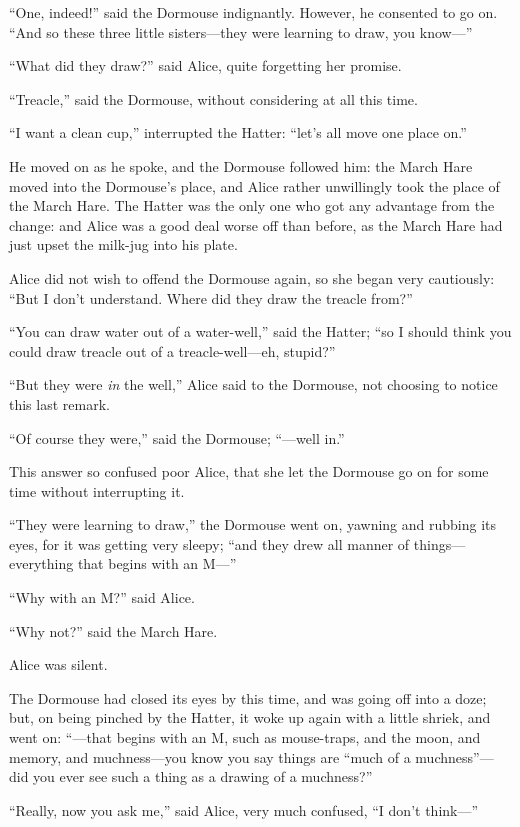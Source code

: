 \documentclass[11pt,openany,oneside]{book}
\begin{document}
“One, indeed!” said the Dormouse indignantly. However, he consented to go on. “And so these three little sisters—they were learning to draw, you know—” 

“What did they draw?” said Alice, quite forgetting her promise. 

“Treacle,” said the Dormouse, without considering at all this time. 

“I want a clean cup,” interrupted the Hatter: “let’s all move one place on.” 

He moved on as he spoke, and the Dormouse followed him: the March Hare moved into the Dormouse’s place, and Alice rather unwillingly took the place of the March Hare. The Hatter was the only one who got any advantage from the change: and Alice was a good deal worse off than before, as the March Hare had just upset the milk-jug into his plate. 

Alice did not wish to offend the Dormouse again, so she began very cautiously: “But I don’t understand. Where did they draw the treacle from?” 

“You can draw water out of a water-well,” said the Hatter; “so I should think you could draw treacle out of a treacle-well—eh, stupid?” 

“But they were {\em in\/} the well,” Alice said to the Dormouse, not choosing to notice this last remark. 

“Of course they were,” said the Dormouse; “—well in.” 

This answer so confused poor Alice, that she let the Dormouse go on for some time without interrupting it. 

“They were learning to draw,” the Dormouse went on, yawning and rubbing its eyes, for it was getting very sleepy; “and they drew all manner of things—everything that begins with an M—” 

“Why with an M?” said Alice. 

“Why not?” said the March Hare. 

Alice was silent. 

The Dormouse had closed its eyes by this time, and was going off into a doze; but, on being pinched by the Hatter, it woke up again with a little shriek, and went on: “—that begins with an M, such as mouse-traps, and the moon, and memory, and muchness—you know you say things are “much of a muchness”—did you ever see such a thing as a drawing of a muchness?” 

“Really, now you ask me,” said Alice, very much confused, “I don’t think—” 
\end{document}
